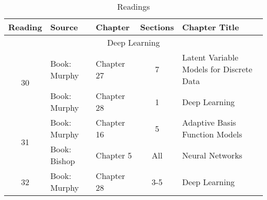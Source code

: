 \documentclass[12pt]{article}
\begin{document}
{    \begin{table}
    \caption{Readings}
    \label{table:readings4}
    \begin{center}
        \begin{tabular}{| c | l | l | c | p{6 cm} |}
            \hline
            Reading & Source & Chapter & Sections & Chapter Title \\
            \hline
            \multicolumn{5}{|c|}{Deep Learning} \\
            \hline
            \multirow{2}{*}{30} & Book: Murphy & Chapter 27 & 7 & Latent Variable Models for Discrete Data \\
                                & Book: Murphy & Chapter 28 & 1 & Deep Learning \\
            \hline
            \multirow{2}{*}{31} & Book: Murphy & Chapter 16 & 5 & Adaptive Basis Function Models \\
                                & Book: Bishop & Chapter 5 & All & Neural Networks \\
            \hline
            \multirow{1}{*}{32} & Book: Murphy & Chapter 28 & 3-5 & Deep Learning \\
            \hline
        \end{tabular}
    \end{center}
    \end{table}

    \clearpage
}
\end{document}
